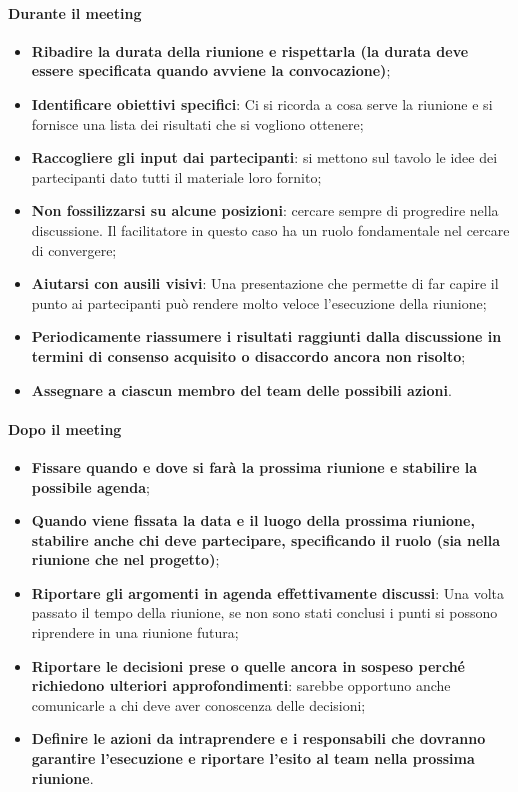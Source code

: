 \paragraph{Durante il meeting}
\begin{itemize}
	\item \textbf{Ribadire la durata della riunione e rispettarla (la durata deve essere specificata quando avviene la convocazione)};
	\item \textbf{Identificare obiettivi specifici}: Ci si ricorda a cosa serve la riunione e si fornisce una lista dei risultati che si vogliono ottenere;
	\item \textbf{Raccogliere gli input dai partecipanti}: si mettono sul tavolo le idee dei partecipanti dato tutti il materiale loro fornito;
	\item \textbf{Non fossilizzarsi su alcune posizioni}: cercare sempre di progredire nella discussione. Il facilitatore in questo caso ha un ruolo fondamentale nel cercare di convergere;
	\item \textbf{Aiutarsi con ausili visivi}: Una presentazione che permette di far capire il punto ai partecipanti può rendere molto veloce l'esecuzione della riunione;
	\item \textbf{Periodicamente riassumere i risultati raggiunti dalla discussione in termini di consenso acquisito o disaccordo ancora non risolto};
	\item \textbf{Assegnare a ciascun membro del team delle possibili azioni}.
\end{itemize}

\paragraph{Dopo il meeting}
\begin{itemize}
	\item \textbf{Fissare quando e dove si farà la prossima riunione e stabilire la possibile agenda};
	\item \textbf{Quando viene fissata la data e il luogo della prossima riunione, stabilire anche chi deve partecipare, specificando il ruolo (sia nella riunione che nel progetto)};
	\item \textbf{Riportare gli argomenti in agenda effettivamente discussi}: Una volta passato il tempo della riunione, se non sono stati conclusi i punti si possono riprendere in una riunione futura;
	\item \textbf{Riportare le decisioni prese o quelle ancora in sospeso perché richiedono ulteriori approfondimenti}: sarebbe opportuno anche comunicarle a chi deve aver conoscenza delle decisioni;
	\item \textbf{Definire le azioni da intraprendere e i responsabili che dovranno garantire l’esecuzione e riportare l’esito al team nella prossima riunione}.
\end{itemize}


